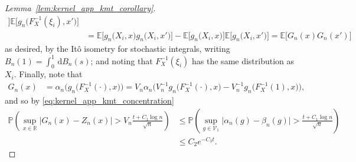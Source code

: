 \documentclass[11pt,lof]{puthesis}
\renewcommand{\P}{\ensuremath{\mathbb{P}}}
\newcommand{\R}{\ensuremath{\mathbb{R}}}
\newcommand{\E}{\ensuremath{\mathbb{E}}}
\newcommand{\cV}{\ensuremath{\mathcal{V}}}
\newcommand{\diff}[1]{\,\mathrm{d}#1}
\theoremstyle{break}
\theoremstyle{proof}
\newtheorem{proof}{Proof}
\begin{document}
\begin{proof}[Lemma~\ref{lem:kernel_app_kmt_corollary}]
\begin{align*}
    \Big]
    \E\Big[
      g_n\big(F_X^{-1}(\xi_i), x'\big)
    \Big] \\
    &=
    \E\Big[
      g_n\big(X_i, x\big)
      g_n\big(X_i, x'\big)
    \Big]
    - \E\Big[
      g_n\big(X_i, x\big)
    \Big]
    \E\Big[
      g_n\big(X_i, x'\big)
    \Big]
    =
    \E\big[
      G_n(x)
      G_n(x')
    \big]
  \end{align*}
  as desired, by the It\^o isometry for stochastic integrals,
  writing $B_n(1) = \int_0^1 \diff{B_n(s)}$;
  and noting that $F_X^{-1}(\xi_i)$
  has the same distribution as $X_i$.
  Finally, note that
  \begin{align*}
    G_n(x)
    &=
    \alpha_n \Big(g_n\big(F_X^{-1}(\cdot), x\big)\Big)
    = V_n \alpha_n \Big(
      V_n^{-1} g_n\big(F_X^{-1}(\cdot), x\big)
      - V_n^{-1} g_n\big(F_X^{-1}(1), x\big)
    \Big),
  \end{align*}
  and so by \eqref{eq:kernel_app_kmt_concentration}
  \begin{align*}
    \P\left(
      \sup_{x \in \R}
      \Big|G_n(x) - Z_n(x)\Big|
      > V_n \frac{t + C_1 \log n}{\sqrt n}
    \right)
    &\leq
    \P\left(
      \sup_{g \in \cV_1}
      \big|\alpha_n(g) - \beta_n(g)\big|
      > \frac{t + C_1\log n}{\sqrt{n}}
    \right) \\
    &\leq C_2 e^{-C_3 t}.
  \end{align*}
\end{proof}
\end{document}
